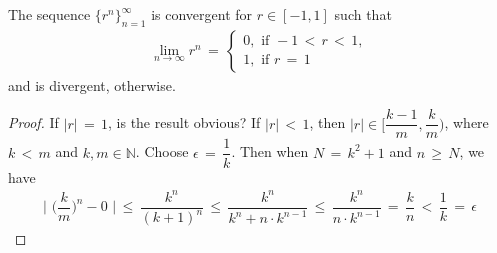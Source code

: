 \begin{theorem}
The sequence $\{r^{n}\}_{n=1}^{\infty}$ is convergent for $r \in [-1, 1]$ such that
\begin{align*}
    \lim_{n \longrightarrow \infty} r^{n} \hspace{2pt} = \hspace{2pt} \begin{cases}
    0, \hspace{4pt} \text{if} \hspace{4pt} -1 \hspace{2pt} < \hspace{2pt} r \hspace{2pt} < \hspace{2pt} 1,\\[2ex]
    1, \hspace{4pt} \text{if} \hspace{4pt} r \hspace{2pt} = \hspace{2pt} 1
    \end{cases}
\end{align*}
and is divergent, otherwise.
\label{geometric_term_sequence}
\begin{proof}
    If $\lvert r \rvert \hspace{2pt} = \hspace{2pt} 1$, is the result obvious? If $\lvert r \rvert \hspace{2pt} < \hspace{2pt} 1$, then $\lvert r \rvert \in \Big[\dfrac{k-1}{m}, \dfrac{k}{m}\Big)$, where $k \hspace{2pt} < \hspace{2pt} m$ and $k, m \in \mathbb{N}$. Choose $\epsilon \hspace{2pt} = \hspace{2pt} \dfrac{1}{k}$. Then when $N \hspace{2pt} = \hspace{2pt} k^{2} + 1$ and $n \hspace{2pt} \geq \hspace{2pt} N$, we have
    \begin{align*}
        \Big|\hspace{4pt} \Big(\dfrac{k}{m}\Big)^{n} - 0 \hspace{4pt} \Big| \hspace{2pt} \leq \hspace{2pt} \dfrac{k^{n}}{(k+1)^{n}} \hspace{2pt} \leq \hspace{2pt} \dfrac{k^{n}}{k^{n} + n \cdot k^{n-1}} \hspace{2pt} \leq \hspace{2pt} \dfrac{k^{n}}{n \cdot k^{n-1}} \hspace{2pt} = \hspace{2pt} \dfrac{k}{n} \hspace{2pt} < \hspace{2pt} \dfrac{1}{k} \hspace{2pt} = \hspace{2pt} \epsilon
    \end{align*}
\end{proof}
\end{theorem}

